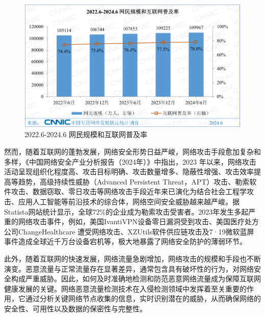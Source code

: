 \documentclass[promaster]{thesis-uestc}
\begin{document}
\begin{figure}[h!]
    \centering
    \includegraphics[width=1\linewidth]{./pic/网民规模.png}
    \caption{2022.6-2024.6 网民规模和互联网普及率}
    \label{netPeople}
\end{figure}

然而，随着互联网的蓬勃发展，网络安全形势日益严峻，网络攻击手段愈加复杂和多样，《中国网络安全产业分析报告（2024年）》中指出，2023 年以来，网络攻击活动呈现组织化程度高、攻击目标明确、攻击数量增多、隐蔽性增强、攻击效率提高等趋势，高级持续性威胁（Advanced Persistent Threat，APT）攻击、勒索软件攻击、数据窃取、零日攻击等网络攻击手段近年来已演化为结合社会工程学攻击、应用人工智能等前沿技术的综合体，网络空间安全威胁越来越严峻。据Statista网站统计显示，全球72\%的企业成为勒索攻击受害者。2023年发生多起严重的网络攻击事件，例如，美国IvantiVPN设备零日漏洞受到攻击、美国医疗处方公司ChangeHealthcare 遭受网络攻击、XZUtils软件供应链攻击及7·19微软蓝屏事件造成全球近千万台设备宕机等，极大地暴露了网络安全防护的薄弱环节。

此外，随着互联网的快速发展，网络流量急剧增加，网络攻击的规模和手段也不断演变。恶意流量与正常流量存在显著差异，通常包含具有破坏性的行为，对网络安全构成严重威胁。因此，如何及时准确地检测和防范恶意网络流量成为保障互联网健康发展的关键。网络恶意流量检测技术在入侵检测领域中发挥着至关重要的作用，它通过分析关键网络节点收集的信息，实时识别潜在的威胁，从而确保网络的安全性、可用性以及数据的保密性与完整性。
\end{document}
